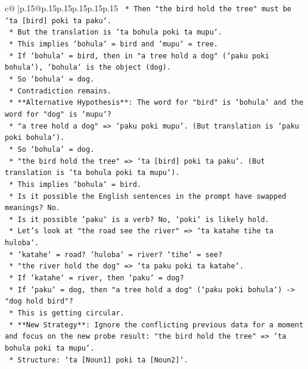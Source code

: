 \documentclass{article}
\begin{document}
{\begin{supertabular}{c@{$\;$}|p{.15\linewidth}@{}p{.15\linewidth}p{.15\linewidth}p{.15\linewidth}p{.15\linewidth}p{.15\linewidth}}
{{{\texttt{        *   Then "the bird hold the tree" must be `ta {[}bird{]} poki ta paku`.} \\
\texttt{        *   But the translation is `ta bohula poki ta mupu`.} \\
\texttt{        *   This implies `bohula` = bird and `mupu` = tree.} \\
\texttt{        *   If `bohula` = bird, then in "a tree hold a dog" (`paku poki bohula`), `bohula` is the object (dog).} \\
\texttt{        *   So `bohula` = dog.} \\
\texttt{        *   Contradiction remains.} \\
\texttt{    *   **Alternative Hypothesis**: The word for "bird" is `bohula` and the word for "dog" is `mupu`?} \\
\texttt{        *   "a tree hold a dog" => `paku poki mupu`. (But translation is `paku poki bohula`).} \\
\texttt{        *   So `bohula` = dog.} \\
\texttt{        *   "the bird hold the tree" => `ta {[}bird{]} poki ta paku`. (But translation is `ta bohula poki ta mupu`).} \\
\texttt{        *   This implies `bohula` = bird.} \\
\texttt{        *   Is it possible the English sentences in the prompt have swapped meanings? No.} \\
\texttt{        *   Is it possible `paku` is a verb? No, `poki` is likely hold.} \\
\texttt{        *   Let's look at "the road see the river" => `ta katahe tihe ta huloba`.} \\
\texttt{            *   `katahe` = road? `huloba` = river? `tihe` = see?} \\
\texttt{        *   "the river hold the dog" => `ta paku poki ta katahe`.} \\
\texttt{            *   If `katahe` = river, then `paku` = dog?} \\
\texttt{            *   If `paku` = dog, then "a tree hold a dog" (`paku poki bohula`) {-}> "dog hold bird"?} \\
\texttt{            *   This is getting circular.} \\
\texttt{    *   **New Strategy**: Ignore the conflicting previous data for a moment and focus on the new probe result: "the bird hold the tree" => `ta bohula poki ta mupu`.} \\
\texttt{        *   Structure: `ta {[}Noun1{]} poki ta {[}Noun2{]}`.} \\
}}}
\end{supertabular}}
\end{document}
